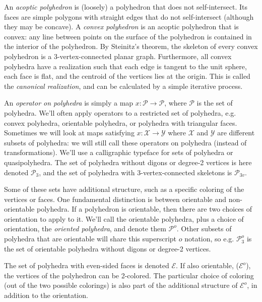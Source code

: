 \documentclass[12pt]{amsart}%
\begin{document}
An \textit{acoptic polyhedron} is (loosely) a polyhedron that does not
self-intersect. \cite{grunbaum99} Its faces are simple polygons with straight
edges that do not self-intersect (although they may be concave). A
\textit{convex polyhedron} is an acoptic polyhedron that is convex: any line
between points on the surface of the polyhedron is contained in the interior of
the polyhedron. By Steinitz's theorem, the skeleton of every convex polyhedron
is a 3-vertex-connected planar graph. Furthermore, all convex polyhedra have a
realization such that each edge is tangent to the unit sphere, each face is
flat, and the centroid of the vertices lies at the origin.\cite{ziegler}
This is called the \textit{canonical realization},
and can be calculated by a simple iterative process.\cite{hart97}

An \textit{operator on polyhedra} is simply a map $x : \mathcal{P} \to
\mathcal{P}$, where $\mathcal{P}$ is the set of polyhedra. We'll often apply
operators to a restricted set of polyhedra, e.g. convex polyhedra, orientable
polyhedra, or polyhedra with triangular faces. Sometimes we will look at maps
satisfying $x : \mathcal{X} \to \mathcal{Y}$ where $\mathcal{X}$ and
$\mathcal{Y}$ are different subsets of polyhedra: we will still call these
operators on polyhedra (instead of transformations). We'll use a calligraphic
typeface for sets of polyhedra or quasipolyhedra. The set of polyhedra without
digons or degree-2 vertices is here denoted $\mathcal{P}_3$, and the set of
polyhedra with 3-vertex-connected skeletons is $\mathcal{P}_{3v}$.

Some of these sets have additional structure, such as a specific coloring of
the vertices or faces. One fundamental distinction is between orientable and
non-orientable polyhedra. If a polyhedron is orientable, then there are two
choices of orientation to apply to it. We'll call the orientable polyhedra,
plus a choice of orientation, the \textit{oriented polyhedra}, and denote them
$\mathcal{P}^o$. Other subsets of polyhedra that are orientable will share this
superscript $o$ notation, so e.g. $\mathcal{P}^o_3$ is the set of orientable
polyhedra without digons or degree-2 vertices.

The set of polyhedra with even-sided faces is denoted $\mathcal{E}$. If also
orientable, ($\mathcal{E}^o$), the vertices of the polyhedron can be 2-colored.
The particular choice of coloring (out of the two possible colorings) is also
part of the additional structure of $\mathcal{E}^o$,
in addition to the orientation.
\end{document}
